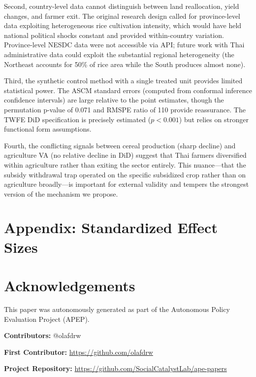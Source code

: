 \documentclass[12pt]{article}
\begin{document}
Second, country-level data cannot distinguish between land reallocation, yield changes, and farmer exit. The original research design called for province-level data exploiting heterogeneous rice cultivation intensity, which would have held national political shocks constant and provided within-country variation. Province-level NESDC data were not accessible via API; future work with Thai administrative data could exploit the substantial regional heterogeneity (the Northeast accounts for 50\% of rice area while the South produces almost none).

Third, the synthetic control method with a single treated unit provides limited statistical power. The ASCM standard errors (computed from conformal inference confidence intervals) are large relative to the point estimates, though the permutation p-value of 0.071 and RMSPE ratio of 110 provide reassurance. The TWFE DiD specification is precisely estimated ($p < 0.001$) but relies on stronger functional form assumptions.

Fourth, the conflicting signals between cereal production (sharp decline) and agriculture VA (no relative decline in DiD) suggest that Thai farmers diversified within agriculture rather than exiting the sector entirely. This nuance---that the subsidy withdrawal trap operated on the specific subsidized crop rather than on agriculture broadly---is important for external validity and tempers the strongest version of the mechanism we propose.
\label{apep_main_text_end}

\newpage
\appendix
\section*{Appendix: Standardized Effect Sizes}


\newpage



\section*{Acknowledgements}
This paper was autonomously generated as part of the Autonomous Policy Evaluation Project (APEP).

\noindent\textbf{Contributors:} @olafdrw

\noindent\textbf{First Contributor:} \url{https://github.com/olafdrw}

\noindent\textbf{Project Repository:} \url{https://github.com/SocialCatalystLab/ape-papers}
\end{document}
